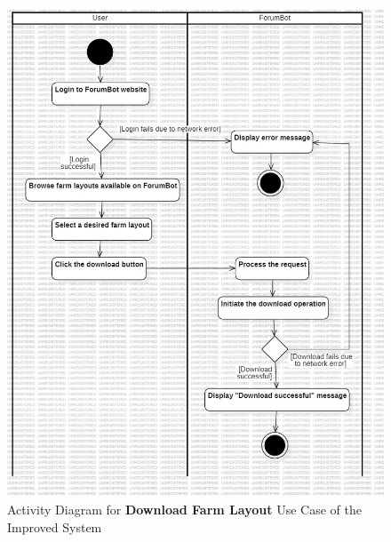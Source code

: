 \begin{figure}[htbp]
    \centering
    \includegraphics[width=1\linewidth]{Figures/download_farm_layout_activity_diagram.jpg}
    \caption{Activity Diagram for \textbf{Download Farm Layout} Use Case of the Improved System}
    \label{DownloadFarmLayoutActivityDiagram}
\end{figure}

\newpage

